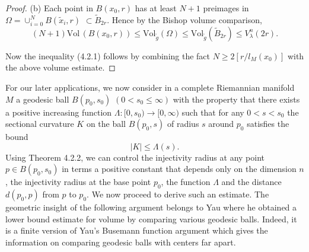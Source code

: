 \begin{proof}
\medskip\noindent
\;\;\;(b) Each point in $B(x_0,r)$ has at least $N\!+\!1$
preimages in $\Omega\!=\!\cup_{i=0}^N B(\tilde x_i, r)$ $\subset
\tilde B_{2r}$. Hence by the Bishop volume comparison,
$$
(N+1)\mbox{Vol}\,(B(x_0,r)) \leq \mbox{Vol}_{\tilde g}(\Omega)
\leq \mbox{Vol}_{\tilde g}(\tilde B_{2r})\le V^n_{\lambda}(2r).
$$

Now the inequality (4.2.1) follows by combining the fact $N\ge
2[r/l_M(x_0)]$ with the above volume estimate.
\end{proof}

For our later applications, we now consider in a complete
Riemannian manifold $M$ a geodesic ball $B(p_0, s_0)$ $(0<s_0\le
\infty)$ with the property that there exists a positive increasing
function $\Lambda : [0, s_0)\to [0, \infty)$ such that for any
$0<s<s_0$ the sectional curvature $K$ on the ball $B(p_0, s)$ of
radius $s$ around $p_0$ satisfies the bound
$$
|K|\le \Lambda(s).
$$
Using Theorem 4.2.2, we can control the injectivity radius at any
point $p\in B(p_0, s_0)$ in terms a positive constant that depends
only on the dimension $n$, the injectivity radius at the base
point $p_0$, the function $\Lambda$ and the distance $d(p_0, p)$
from $p$ to $p_0$. We now proceed to derive such an estimate. The
geometric insight of the following argument belongs to Yau
\cite{Y76} where he obtained a lower bound estimate for volume by
comparing various geodesic balls.  Indeed, it is a finite version
of Yau's Busemann function argument which gives the information on
comparing geodesic balls with centers far apart.

